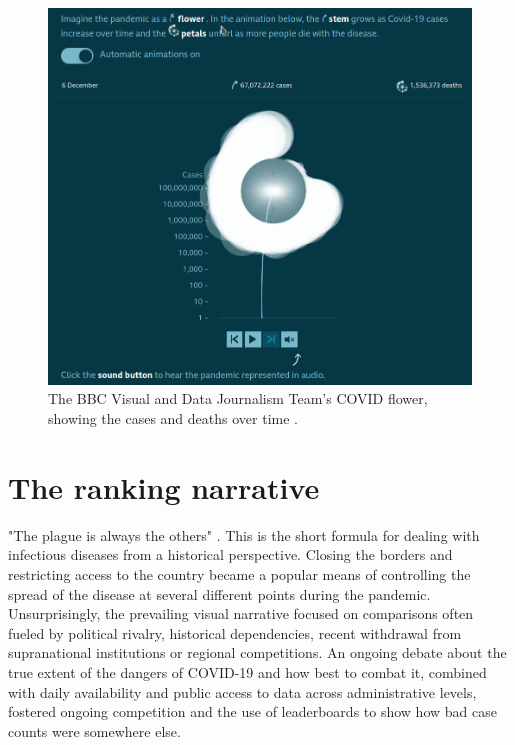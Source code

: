 \documentclass[article]{jdssv}\usepackage[]{graphicx}\usepackage[]{color}
\begin{document}
\begin{figure}
\centering
\includegraphics[width=.8\linewidth]{Figures_Web/BBC_flower_time_series}
\caption{The BBC Visual and Data Journalism Team's COVID flower, showing the cases and deaths over time \citep{thebbcvisualanddatajournalismteamCoronavirusHowCan2020}.}\label{fig:bbc-flower}
\end{figure}


\section{The ranking narrative}
\label{sec:rankings}

"The plague is always the others" \citep{thiessen2021}. This is the short formula for dealing with infectious diseases from a historical perspective. Closing the borders and restricting access to the country became a popular means of controlling the spread of the disease at several different points during the pandemic. Unsurprisingly, the prevailing visual narrative focused on comparisons often fueled by political rivalry, historical dependencies, recent withdrawal from supranational institutions or regional competitions. An ongoing debate about the true extent of the dangers of COVID-19 and how best to combat it, combined with daily availability and public access to data across administrative levels, fostered ongoing competition and the use of leaderboards to show how bad case counts were somewhere else. 
\end{document}

